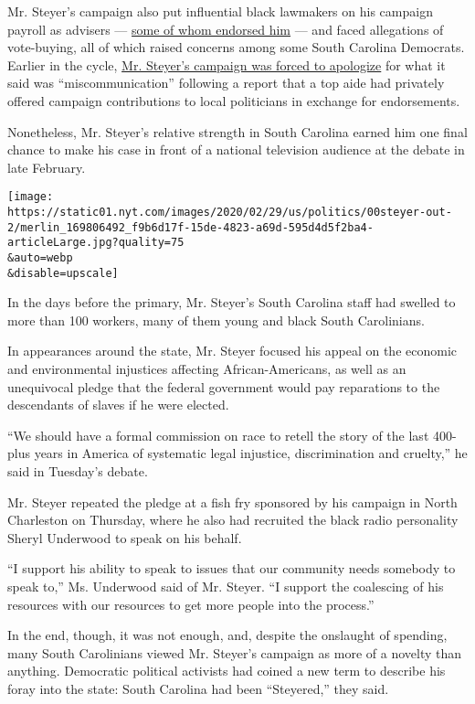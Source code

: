 Mr. Steyer's campaign also put influential black lawmakers on his
campaign payroll as advisers ---
\href{https://www.nytimes.com/2020/02/12/us/politics/bernie-sanders-tom-steyer-south-carolina.html}{some
of whom endorsed him} --- and faced allegations of vote-buying, all of
which raised concerns among some South Carolina Democrats. Earlier in
the cycle,
\href{https://www.nytimes.com/2019/11/07/us/politics/tom-steyer-endorsements.html}{Mr.
Steyer's campaign was forced to apologize} for what it said was
``miscommunication'' following a report that a top aide had privately
offered campaign contributions to local politicians in exchange for
endorsements.

Nonetheless, Mr. Steyer's relative strength in South Carolina earned him
one final chance to make his case in front of a national television
audience at the debate in late February.

\texttt{[image: https://static01.nyt.com/images/2020/02/29/us/politics/00steyer-out-2/merlin\_169806492\_f9b6d17f-15de-4823-a69d-595d4d5f2ba4-articleLarge.jpg?quality=75\\\&auto=webp\\\&disable=upscale]}

In the days before the primary, Mr. Steyer's South Carolina staff had
swelled to more than 100 workers, many of them young and black South
Carolinians.

In appearances around the state, Mr. Steyer focused his appeal on the
economic and environmental injustices affecting African-Americans, as
well as an unequivocal pledge that the federal government would pay
reparations to the descendants of slaves if he were elected.

``We should have a formal commission on race to retell the story of the
last 400-plus years in America of systematic legal injustice,
discrimination and cruelty,'' he said in Tuesday's debate.

Mr. Steyer repeated the pledge at a fish fry sponsored by his campaign
in North Charleston on Thursday, where he also had recruited the black
radio personality Sheryl Underwood to speak on his behalf.

``I support his ability to speak to issues that our community needs
somebody to speak to,'' Ms. Underwood said of Mr. Steyer. ``I support
the coalescing of his resources with our resources to get more people
into the process.''

In the end, though, it was not enough, and, despite the onslaught of
spending, many South Carolinians viewed Mr. Steyer's campaign as more of
a novelty than anything. Democratic political activists had coined a new
term to describe his foray into the state: South Carolina had been
``Steyered,'' they said.

